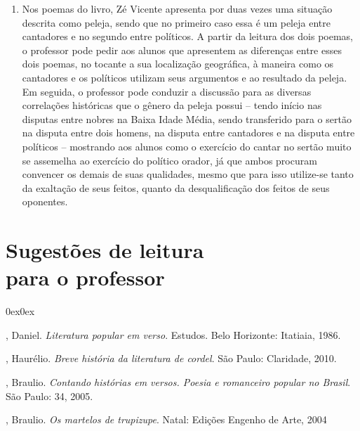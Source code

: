 \begin{enumerate}
\item Nos poemas do livro, Zé Vicente apresenta por duas vezes uma situação
descrita como peleja, sendo que no primeiro caso essa é um peleja entre
cantadores e no segundo entre políticos. A partir da leitura dos dois
poemas, o professor pode pedir aos alunos que apresentem as diferenças
entre esses dois poemas, no tocante a sua localização geográfica, à
maneira como os cantadores e os políticos utilizam seus argumentos e
ao resultado da peleja. Em seguida, o professor pode conduzir a
discussão para as diversas correlações históricas que o gênero da peleja possui 
-- tendo início nas disputas entre nobres na Baixa Idade
Média, sendo transferido para o sertão na disputa entre dois homens, na
disputa entre cantadores e na disputa entre políticos -- mostrando
aos alunos como o exercício do cantar no sertão muito se assemelha ao
exercício do político orador, já que ambos procuram convencer os
demais de suas qualidades, mesmo que para isso utilize-se tanto da
exaltação de seus feitos, quanto da desqualificação dos feitos de 
seus oponentes. 


\end{enumerate}
\pagebreak
\section{Sugestões de leitura\\ para o professor} 

\begin{description}0ex\parsep0ex

, Daniel. \textit{Literatura popular em verso}. Estudos. Belo Horizonte: Itatiaia, 1986. 

, Haurélio. \textit{Breve história da literatura de cordel}. São Paulo: Claridade, 2010.

, Braulio. \textit{Contando histórias em versos. Poesia e romanceiro popular 
no Brasil}. São Paulo: 34, 2005.

, Braulio. \textit{Os martelos de trupizupe}. Natal: Edições Engenho de Arte, 2004


\end{description}